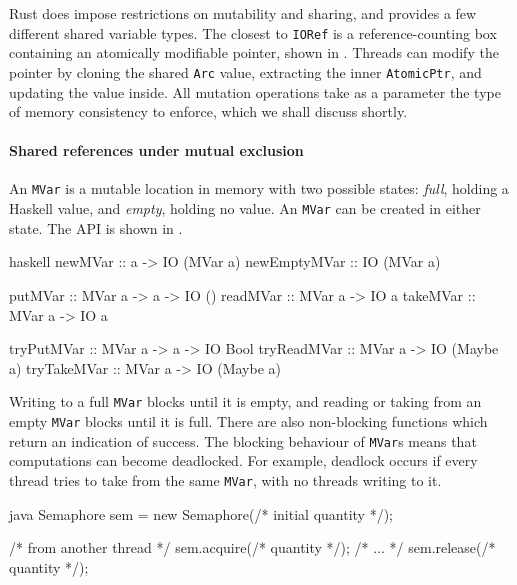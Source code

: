 Rust does impose restrictions on mutability and sharing, and provides
a few different shared variable types.  The closest to \verb|IORef| is
a reference-counting box containing an atomically modifiable pointer,
shown in .  Threads can modify the pointer by
cloning the shared \verb|Arc| value, extracting the inner
\verb|AtomicPtr|, and updating the value inside.  All mutation
operations take as a parameter the type of memory consistency to
enforce, which we shall discuss shortly. \label{page:rust_mem}

\paragraph{Shared references under mutual exclusion}
An \verb|MVar| is a mutable location in memory with two possible
states: \emph{full}, holding a Haskell value, and \emph{empty},
holding no value.  An \verb|MVar| can be created in either state.  The
API is shown in .

\begin{listing}
\centering
\begin{cminted}{haskell}
newMVar      :: a -> IO (MVar a)
newEmptyMVar :: IO (MVar a)

putMVar      :: MVar a -> a -> IO ()
readMVar     :: MVar a -> IO a
takeMVar     :: MVar a -> IO a

tryPutMVar   :: MVar a -> a -> IO Bool
tryReadMVar  :: MVar a -> IO (Maybe a)
tryTakeMVar  :: MVar a -> IO (Maybe a)
\end{cminted}
\caption{Mutual exclusion in Haskell.}\label{lst:mute_haskell}
\end{listing}

Writing to a full \verb|MVar| blocks until it is empty, and reading or
taking from an empty \verb|MVar| blocks until it is full.  There are
also non-blocking functions which return an indication of success.
The blocking behaviour of \verb|MVar|s means that computations can
become deadlocked.  For example, deadlock occurs if every thread tries
to take from the same \verb|MVar|, with no threads writing to it.

\begin{listing}
\centering
\begin{cminted}{java}
Semaphore sem = new Semaphore(/* initial quantity */);

/* from another thread */
sem.acquire(/* quantity */);
/* ... */
sem.release(/* quantity */);
\end{cminted}
\caption{Mutual exclusion in Java.}\label{lst:mute_java}
\end{listing}

